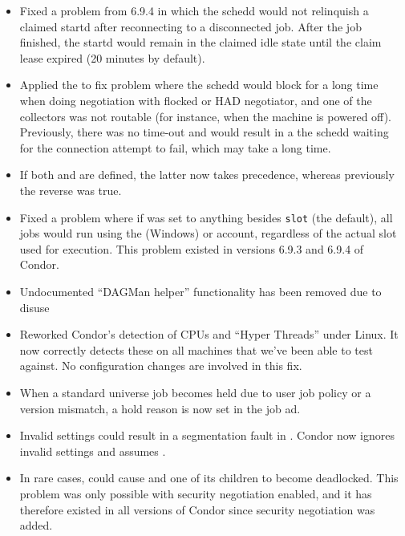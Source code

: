 \begin{itemize}
\item Fixed a problem from 6.9.4 in which the schedd would not
relinquish a claimed startd after reconnecting to a disconnected job.
After the job finished, the startd would remain in the claimed idle
state until the claim lease expired (20 minutes by default).

\item Applied the  to fix problem where the schedd 
would block for a long time when doing negotiation with flocked or HAD 
negotiator, and one of the collectors was not routable (for instance, when 
the machine is powered off). Previously, there was no time-out and would
result in a the schedd waiting for the connection attempt to fail, which may
take a long time.

\item If both  and
 are defined, the latter
now takes precedence, whereas previously the reverse was true.

\item Fixed a problem where if  was
set to anything besides \texttt{slot} (the default), all jobs would
run using the  (Windows) or
 account, regardless of the actual slot used for
execution. This problem existed in versions 6.9.3 and 6.9.4 of Condor.

\item Undocumented ``DAGMan helper'' functionality has been removed
  due to disuse

\item Reworked Condor's detection of CPUs and ``Hyper Threads'' under
  Linux.  It now correctly detects these on all machines that we've
  been able to test against.  No configuration changes are involved in
  this fix.

\item When a standard universe job becomes held due to user job policy or
a version mismatch, a hold reason is now set in the job ad.

\item Invalid  settings could result in a 
segmentation fault in . 
Condor now ignores invalid settings and assumes .

\item In rare cases,  could cause  and
one of its children to become deadlocked.  This problem was only
possible with security negotiation enabled, and it has therefore
existed in all versions of Condor since security negotiation was
added.


\end{itemize}
